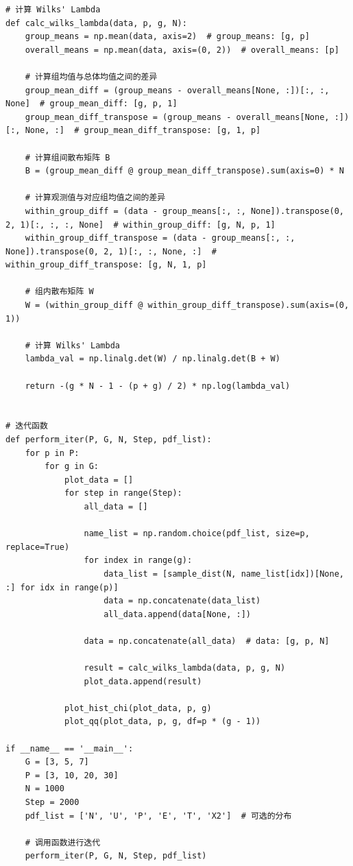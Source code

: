 \documentclass{article} %
\begin{document}
\begin{lstlisting}
# 计算 Wilks' Lambda
def calc_wilks_lambda(data, p, g, N):
    group_means = np.mean(data, axis=2)  # group_means: [g, p]
    overall_means = np.mean(data, axis=(0, 2))  # overall_means: [p]

    # 计算组均值与总体均值之间的差异
    group_mean_diff = (group_means - overall_means[None, :])[:, :, None]  # group_mean_diff: [g, p, 1]
    group_mean_diff_transpose = (group_means - overall_means[None, :])[:, None, :]  # group_mean_diff_transpose: [g, 1, p]

    # 计算组间散布矩阵 B
    B = (group_mean_diff @ group_mean_diff_transpose).sum(axis=0) * N

    # 计算观测值与对应组均值之间的差异
    within_group_diff = (data - group_means[:, :, None]).transpose(0, 2, 1)[:, :, :, None]  # within_group_diff: [g, N, p, 1]
    within_group_diff_transpose = (data - group_means[:, :, None]).transpose(0, 2, 1)[:, :, None, :]  # within_group_diff_transpose: [g, N, 1, p]

    # 组内散布矩阵 W
    W = (within_group_diff @ within_group_diff_transpose).sum(axis=(0, 1))

    # 计算 Wilks' Lambda
    lambda_val = np.linalg.det(W) / np.linalg.det(B + W)

    return -(g * N - 1 - (p + g) / 2) * np.log(lambda_val)


# 迭代函数
def perform_iter(P, G, N, Step, pdf_list):
    for p in P:
        for g in G:
            plot_data = []
            for step in range(Step):
                all_data = []

                name_list = np.random.choice(pdf_list, size=p, replace=True)
                for index in range(g):
                    data_list = [sample_dist(N, name_list[idx])[None, :] for idx in range(p)]
                    data = np.concatenate(data_list)
                    all_data.append(data[None, :])

                data = np.concatenate(all_data)  # data: [g, p, N]

                result = calc_wilks_lambda(data, p, g, N)
                plot_data.append(result)

            plot_hist_chi(plot_data, p, g)
            plot_qq(plot_data, p, g, df=p * (g - 1))

if __name__ == '__main__':
    G = [3, 5, 7]
    P = [3, 10, 20, 30]
    N = 1000
    Step = 2000
    pdf_list = ['N', 'U', 'P', 'E', 'T', 'X2']  # 可选的分布

    # 调用函数进行迭代
    perform_iter(P, G, N, Step, pdf_list)
\end{lstlisting}
\end{document}
